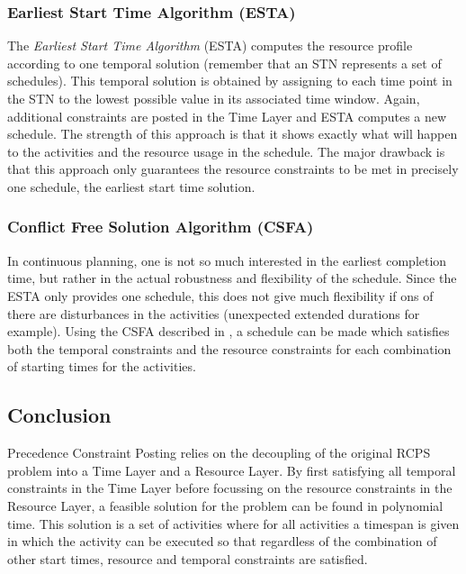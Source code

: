\documentclass{article}
\begin{document}
\subsubsection{Earliest Start Time Algorithm (ESTA)}
The \emph{Earliest Start Time Algorithm} (ESTA) computes the resource profile according to one temporal solution (remember that an STN represents a set of schedules). This temporal solution is obtained by assigning to each time point in the STN to the lowest possible value in its associated time window. Again, additional constraints are posted in the Time Layer and ESTA computes a new schedule. The strength of this approach is that it shows exactly what will happen to the activities and the resource usage in the schedule. The major drawback is that this approach only guarantees the resource constraints to be met in precisely one schedule, the earliest start time solution. 

\subsubsection{Conflict Free Solution Algorithm (CSFA)}
In continuous planning, one is not so much interested in the earliest completion time, but rather in the actual robustness and flexibility of the schedule. Since the ESTA only provides one schedule, this does not give much flexibility if ons of there are disturbances in the activities (unexpected extended durations for example). Using the CSFA described in \cite{cesta98}, a schedule can be made which satisfies both the temporal constraints and the resource constraints for each combination of starting times for the activities.

\subsection{Conclusion}
Precedence Constraint Posting relies on the decoupling of the original RCPS problem into a Time Layer and a Resource Layer. By first satisfying all temporal constraints in the Time Layer before focussing on the resource constraints in the Resource Layer, a feasible solution for the problem can be found in polynomial time. This solution is a set of activities where for all activities a timespan is given in which the activity can be executed so that regardless of the combination of other start times, resource and temporal constraints are satisfied.

\newpage
\end{document}
